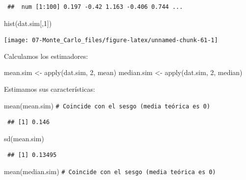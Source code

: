 \documentclass[
  10pt,
]{book}
\newenvironment{Shaded}{\begin{snugshade}}{\end{snugshade}}
\newcommand{\CommentTok}[1]{\textcolor[rgb]{0.56,0.35,0.01}{\textit{#1}}}
\newcommand{\DecValTok}[1]{\textcolor[rgb]{0.00,0.00,0.81}{#1}}
\newcommand{\FunctionTok}[1]{\textcolor[rgb]{0.00,0.00,0.00}{#1}}
\newcommand{\NormalTok}[1]{#1}
\newcommand{\OtherTok}[1]{\textcolor[rgb]{0.56,0.35,0.01}{#1}}
\theoremstyle{break}
\theoremstyle{nonumberplain}
\renewcommand{\CommentTok}[1]{\textcolor[rgb]{0.41,0.41,0.41}{\texttt{#1}}}
\begin{document}
\begin{enumerate}
\begin{verbatim}
 ##  num [1:100] 0.197 -0.42 1.163 -0.406 0.744 ...
\end{verbatim}

\begin{Shaded}
\begin{Highlighting}[]
\FunctionTok{hist}\NormalTok{(dat.sim[,}\DecValTok{1}\NormalTok{])}
\end{Highlighting}
\end{Shaded}

  \begin{center}\texttt{[image: 07-Monte\_Carlo\_files/figure-latex/unnamed-chunk-61-1]} \end{center}

  Calculamos los estimadores:

\begin{Shaded}
\begin{Highlighting}[]
\NormalTok{mean.sim }\OtherTok{\textless{}{-}} \FunctionTok{apply}\NormalTok{(dat.sim, }\DecValTok{2}\NormalTok{, mean)}
\NormalTok{median.sim }\OtherTok{\textless{}{-}} \FunctionTok{apply}\NormalTok{(dat.sim, }\DecValTok{2}\NormalTok{, median)}
\end{Highlighting}
\end{Shaded}

  Estimamos sus características:

\begin{Shaded}
\begin{Highlighting}[]
\FunctionTok{mean}\NormalTok{(mean.sim) }\CommentTok{\# Coincide con el sesgo (media teórica es 0)}
\end{Highlighting}
\end{Shaded}

\begin{verbatim}
 ## [1] 0.146
\end{verbatim}

\begin{Shaded}
\begin{Highlighting}[]
\FunctionTok{sd}\NormalTok{(mean.sim)}
\end{Highlighting}
\end{Shaded}

\begin{verbatim}
 ## [1] 0.13495
\end{verbatim}

\begin{Shaded}
\begin{Highlighting}[]
\FunctionTok{mean}\NormalTok{(median.sim) }\CommentTok{\# Coincide con el sesgo (media teórica es 0)}
\end{Highlighting}
\end{Shaded}


\end{enumerate}
\end{document}
